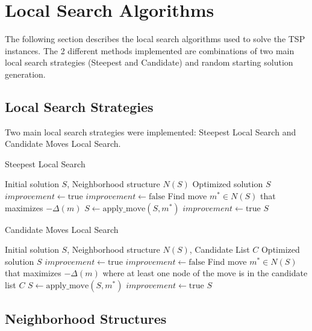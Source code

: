 \section{Local Search Algorithms}

The following section describes the local search algorithms used to solve the TSP instances. The 2 different methods implemented are combinations of two main local search strategies (Steepest and Candidate) and random starting solution generation.

\subsection{Local Search Strategies}

Two main local search strategies were implemented: Steepest Local Search and Candidate Moves Local Search.

\begin{algorithm}
\caption{Steepest Local Search}
\label{alg:steepest_ls}
\begin{algorithmic}[1]
\Require Initial solution $S$, Neighborhood structure $N(S)$
\Ensure Optimized solution $S$
\State $improvement \gets \text{true}$
    \State $improvement \gets \text{false}$
    \State Find move $m^* \in N(S)$ that maximizes $-\Delta(m)$
        \State $S \gets \text{apply\_move}(S, m^*)$
        \State $improvement \gets \text{true}$
    \EndIf
\EndWhile
\State \Return $S$
\end{algorithmic}
\end{algorithm}

\begin{algorithm}
\caption{Candidate Moves Local Search}
\label{alg:candidate_ls}
\begin{algorithmic}[1]
\Require Initial solution $S$, Neighborhood structure $N(S)$, Candidate List $C$
\Ensure Optimized solution $S$
\State $improvement \gets \text{true}$
    \State $improvement \gets \text{false}$
    \State Find move $m^* \in N(S)$ that maximizes $-\Delta(m)$ where at least one node of the move is in the candidate list $C$
        \State $S \gets \text{apply\_move}(S, m^*)$
        \State $improvement \gets \text{true}$
    \EndIf
\EndWhile
\State \Return $S$
\end{algorithmic}
\end{algorithm}

\newpage

\subsection{Neighborhood Structures}


